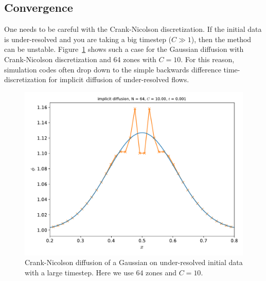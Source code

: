 \subsection{Convergence}

One needs to be careful with the Crank-Nicolson discretization.  If
the initial data is under-resolved and you are taking a big timestep
($C \gg 1$), then the method can be unstable.
Figure~\ref{fig:diff:cnunstable} shows such a case for the Gaussian
diffusion with Crank-Nicolson discretization and 64 zones with $C =
10$.  For this reason, simulation codes often drop down to the
simple backwards difference time-discretization for implicit diffusion
of under-resolved flows.

\begin{figure}
\centering
\includegraphics[width=\linewidth]{diff-implicit-64-CFL_10_0}
\caption[Under-resolved Crank-Nicolson diffusion]
{\label{fig:diff:cnunstable} Crank-Nicolson diffusion of a Gaussian
on under-resolved initial data with a large timestep.  Here we use
$64$ zones and $C= 10$.}
\end{figure}


